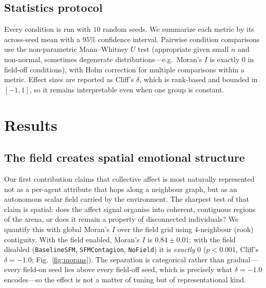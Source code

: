 \documentclass[sigconf,nonacm]{acmart}
\begin{document}
\subsection{Statistics protocol}
Every condition is run with $10$ random seeds. We summarize each metric by its
across-seed mean with a $95\%$ confidence interval. Pairwise condition
comparisons use the non-parametric Mann--Whitney $U$ test (appropriate given
small $n$ and non-normal, sometimes degenerate distributions---e.g.\ Moran's
$I$ is exactly $0$ in field-off conditions), with Holm correction for multiple
comparisons within a metric. Effect sizes are reported as Cliff's $\delta$,
which is rank-based and bounded in $[-1,1]$, so it remains interpretable even
when one group is constant.

\section{Results}
\subsection{The field creates spatial emotional structure}
\label{sec:morans}
Our first contribution claims that collective affect is most naturally represented not as a per-agent
attribute that hops along a neighbour graph, but as an autonomous scalar field carried by the
environment. The sharpest test of that claim is spatial: does the affect signal organise into
coherent, contiguous regions of the arena, or does it remain a property of disconnected individuals?
We quantify this with global Moran's $I$ over the field grid using $4$-neighbour (rook) contiguity.
With the field enabled, Moran's $I$ is $0.84\pm0.01$; with the field disabled
(\texttt{BaselineSFM}, \texttt{SFMContagion}, \texttt{NoField}) it is \emph{exactly} $0$
($p<0.001$, Cliff's $\delta=-1.0$; Fig.~\ref{fig:morans}). The separation is categorical rather than
gradual---every field-on seed lies above every field-off seed, which is precisely what $\delta=-1.0$
encodes---so the effect is not a matter of tuning but of representational kind.
\end{document}

